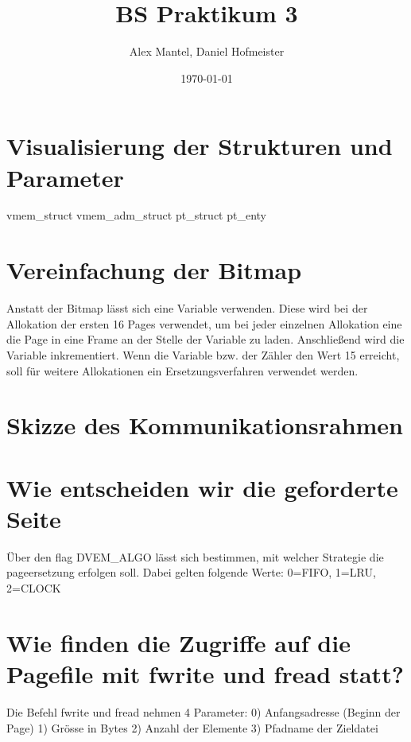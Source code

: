 \documentclass[pdftex,10pt,a4paper]{article}
\begin{document}
\title{BS Praktikum 3}
\author{Alex Mantel, Daniel Hofmeister}
\date{\today}
\maketitle
\newpage

\tableofcontents
\newpage

\section{Visualisierung der Strukturen und Parameter}
        
vmem\_struct
  vmem\_adm\_struct
  pt\_struct
    pt\_enty

\section{Vereinfachung der Bitmap}
Anstatt der Bitmap l\"asst sich eine Variable verwenden. Diese wird bei der Allokation der ersten 16 Pages verwendet, um bei jeder einzelnen Allokation eine die Page in eine Frame an der Stelle der Variable zu laden. Anschlie{\ss}end wird die Variable inkrementiert. Wenn die Variable bzw. der Z\"ahler den Wert 15 erreicht, soll f\"ur weitere Allokationen ein Ersetzungsverfahren verwendet werden.

\section{Skizze des Kommunikationsrahmen}

\section{Wie entscheiden wir die geforderte Seite}
\"Uber den flag DVEM\_ALGO l\"asst sich bestimmen, mit welcher Strategie die pageersetzung erfolgen soll. Dabei gelten folgende Werte: 0=FIFO, 1=LRU, 2=CLOCK

\section{Wie finden die Zugriffe auf die Pagefile mit fwrite und fread statt?}
Die Befehl fwrite und fread nehmen 4 Parameter:
0) Anfangsadresse (Beginn der Page)
1) Gr\"osse in Bytes
2) Anzahl der Elemente 
3) Pfadname der Zieldatei
\end{document}
